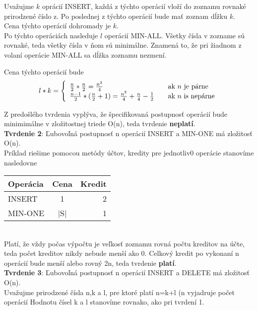 \documentclass[paper=a4, fontsize=11pt]{scrartcl} %
\numberwithin{equation}{section} %
\numberwithin{figure}{section} %
\numberwithin{table}{section} %
\begin{document}
Uvažujme $k$ oprácií INSERT, každá z týchto operácií vloží do zoznamu rovnaké prirodzené číslo z.
Po poslednej z týchto operácií bude mať zoznam dĺžku $k$. \\

Cena týchto operácií dohromady je $k$. \\

Po týchto operáciách nasleduje $l$ operácií MIN-ALL.
Všetky čísla v zozname sú rovnaké, teda všetky čísla v ňom sú minimálne.
Znamená to, že pri žiadnom z volaní operácie MIN-ALL sa dĺžka zoznamu nezmení.


Cena týchto operácií bude 
\[ l*k = \left\{ 
  \begin{array}{l l}
    \frac{n}{2}* \frac{n}{2} = \frac{n^2}{4} & \quad \text{ak $n$ je párne}\\
    \frac{n-1}{2}* (\frac{n}{2} + 1) = \frac{n^2}{4} + \frac{n}{4} - \frac{1}{2} & \quad \text{ak $n$ is nepárne}
  \end{array} \right.\]

Z predošlého tvrdenia vyplýva, že špecifikovaná postupnosť operácií bude minimimálne v zložitostnej triede O(n), teda tvrdenie \textbf{neplatí}. \\

\textbf{Tvrdenie 2}: Ľubovoľná postupnosť n operácií INSERT  a MIN-ONE má zložitosť O(n). \\
Príklad riešime pomocou metódy účtov, kredity pre jednotliv0 operácie stanovíme nasledovne \\

  \begin{tabular}{ | l | c | r | }
    \hline
    Operácia & Cena & Kredit \\	
    \hline
    INSERT & 1 & 2 \\ 
    MIN-ONE & |S| & 1 \\
    \hline
  \end{tabular}\\

Platí, že vždy počas výpočtu je veľkosť zoznamu rovná počtu kreditov na účte, teda počet kreditov nikdy nebude menší ako 0.
Celkový kredit po vykonaní n operácií bude menší alebo rovný 2n, teda tvrdenie \textbf{platí}. \\


\textbf{Tvrdenie 3}: Ľubovoľná postupnosť n operácií INSERT a DELETE má zložitosť O(n). \\

Uvažujme prirodzené čísla n,k a l, pre ktoré platí n=k+l (n vyjadruje počet operácií
Hodnotu čísel k a l stanovíme rovnako, ako pri tvrdení 1.
\end{document}
